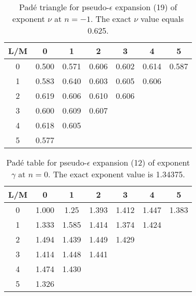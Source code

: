 \documentclass[preprint,preprintnumbers,amsmath,amssymb]{revtex4}
\begin{document}
\begin{table}[t]
\caption{Pad\'e triangle for pseudo-$\epsilon$ expansion (19) of exponent
$\nu$ at $n = -1$. The exact $\nu$ value equals 0.625.}
\label{tab3}
\renewcommand{\tabcolsep}{0.4cm}
\begin{tabular}{|*{7}{c|}}
              \hline
              L/M & 0 & 1 & 2 & 3 & 4 & 5 \\ \hline
              0 & 0.500 & 0.571 & 0.606 & 0.602 & 0.614 & 0.587 \\ \hline
              1 & 0.583 & 0.640 & 0.603 & 0.605 & 0.606 &       \\ \hline
              2 & 0.619 & 0.606 & 0.610 & 0.606 &       &       \\ \hline
              3 & 0.600 & 0.609 & 0.607 &       &       &       \\ \hline
              4 & 0.618 & 0.605 &       &       &       &       \\ \hline
              5 & 0.577 &       &       &       &       &
               \\ \hline
\end{tabular}
\end{table}

\begin{table}[t]
\caption{Pad\'e table for pseudo-$\epsilon$ expansion (12) of exponent $\gamma$
at $n = 0$. The exact exponent value is 1.34375.}
\label{tab4}
\renewcommand{\tabcolsep}{0.4cm}
\begin{tabular}{|*{7}{c|}}
              \hline
              L/M & 0 & 1 & 2 & 3 & 4 & 5 \\ \hline
              0 & 1.000 & 1.25  & 1.393 & 1.412 & 1.447 & 1.383 \\ \hline
              1 & 1.333 & 1.585 & 1.414 & 1.374 & 1.424 &       \\ \hline
              2 & 1.494 & 1.439 & 1.449 & 1.429 &       &       \\ \hline
              3 & 1.414 & 1.448 & 1.441 &       &       &       \\ \hline
              4 & 1.474 & 1.430 &       &       &       &       \\ \hline
              5 & 1.326 &       &       &       &       &
               \\ \hline
\end{tabular}
\end{table}
\end{document}
